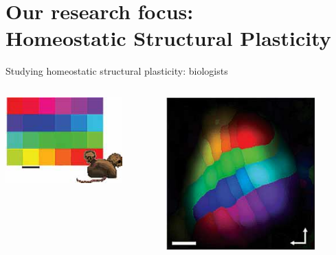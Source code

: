 \section{Our research focus:\\Homeostatic Structural Plasticity}
\begin{frame}[c]{Studying homeostatic structural plasticity: biologists}
  \begin{columns}
    \begin{column}{0.5\textwidth}
      \centering
      \includegraphics[width=0.8\textwidth]{99_images/keck-1-1a}%
    \end{column}
    \begin{column}{0.5\textwidth}
      \centering
      \includegraphics[width=0.8\textwidth]{99_images/keck-1-1c}%
    \end{column}
  \end{columns}
\end{frame}

